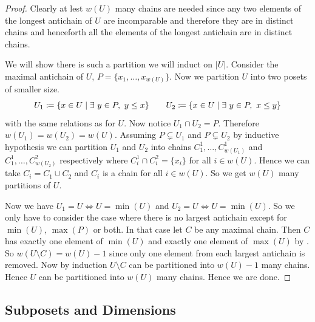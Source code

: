 \begin{proof}
	Clearly at lest $w(U)$ many chains are needed since any two elements of the longest antichain of $U$ are incomparable and therefore they are in distinct chains and henceforth all the elements of the longest antichain are in distinct chains.
	
	We will show there is such a partition we will induct on $|U|$. Consider the maximal antichain of $U$, $P=\{x_1,\dots, x_{w(U)}\}$. Now we partition $U$ into two posets of smaller size.$$U_1\coloneqq \{x\in U\mid \exists\ y\in P,\ y\leq x\}\qquad U_2\coloneqq \{x\in U\mid \exists\ y\in P,\ x\leq y\}$$ with the same relations as for $U$. Now notice $U_1\cap U_2=P$. Therefore $w(U_1)=w(U_2)=w(U)$. Assuming $P\subsetneq U_1$ and $P\subsetneq U_2$ by inductive hypothesis we can partition $U_1$ and $U_2$ into chains $C^1_1,\dots, C_{w(U_1)}^1$ and $C_1^1,\dots, C_{w(U_2)}^2$ respectively where $C_i^1\cap C_i^2=\{x_i\}$ for all $i\in w(U)$. Hence we can take $C_i=C_1\cup C_2$ and $C_i$ is a chain for all $i\in w(U)$. So we get $w(U)$ many partitions of $U$.
	
	Now we have $U_1=U\iff U=\min(U)$ and $U_2=U\iff U=\min(U)$. So we only have to consider the case where  there is no largest antichain except for $\min(U )$, $\max(P )$ or both.  In that case let $C$ be any maximal chain. Then $C$ has exactly one element of $\min(U)$ and exactly one element of $\max(U)$ by . So $w(U\setminus C)=w(U)-1$ since only one element from each largest antichain is removed. Now by induction $U\setminus C$ can be partitioned into $w(U)-1$ many chains. Hence $U$ can be partitioned into $w(U)$ many chains. Hence we are done. 
\end{proof}
\subsection{Subposets and Dimensions}

